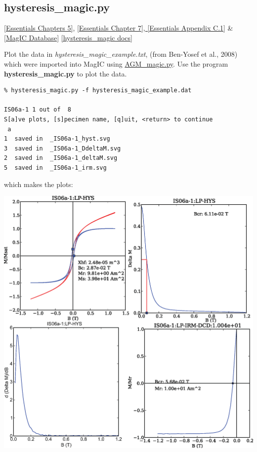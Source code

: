 \documentclass[11pt]{book}
\begin{document}
{{
\subsection{hysteresis\_magic.py}
\href{http://earthref.org/MAGIC/books/Tauxe/Essentials/WebBook3ch5.html#ch5}{[Essentials Chapters 5]}, \href{http://earthref.org/MAGIC/books/Tauxe/Essentials/WebBook3ch7.html#ch7}{[Essentials Chapter 7], }  \href{http://earthref.org/MAGIC/books/Tauxe/Essentials/WebBook3ap3.html#hysteresis_parameters}{[Essentials Appendix C.1]} \& \href{#MagICDatabase}{[MagIC Database]}
\href{https://github.com/PmagPy/PmagPy/blob/master/programs/hysteresis_magic.py}{[hysteresis\_magic docs]}

Plot the data in {\it hysteresis\_magic\_example.txt}, (from  Ben-Yosef et al., 2008) \nocite{benyosef08} which were imported into MagIC using  \href{#AGM_magic.py}{AGM\_magic.py}.   Use the program  {\bf hysteresis\_magic.py} to plot the data.

\begin{verbatim}
% hysteresis_magic.py -f hysteresis_magic_example.dat

IS06a-1 1 out of  8
S[a]ve plots, [s]pecimen name, [q]uit, <return> to continue
 a
1  saved in  _IS06a-1_hyst.svg
3  saved in  _IS06a-1_DdeltaM.svg
2  saved in  _IS06a-1_deltaM.svg
5  saved in  _IS06a-1_irm.svg
\end{verbatim}

\noindent which makes the plots:


  \includegraphics[width=15cm]{EPSfiles/hysteresis-magic.eps}




}}
\end{document}
